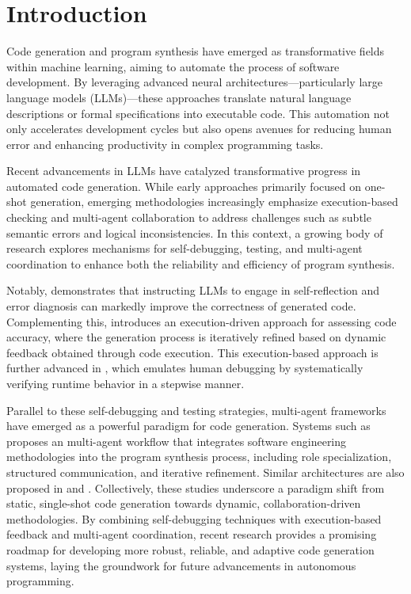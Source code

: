 

\section{Introduction}

Code generation and program synthesis have emerged as transformative fields within machine learning, aiming to automate the process of software development. By leveraging advanced neural architectures—particularly large language models (LLMs)—these approaches translate natural language descriptions or formal specifications into executable code. This automation not only accelerates development cycles but also opens avenues for reducing human error and enhancing productivity in complex programming tasks.

Recent advancements in LLMs have catalyzed transformative progress in automated code generation. While early approaches primarily focused on one-shot generation, emerging methodologies increasingly emphasize execution-based checking and multi-agent collaboration to address challenges such as subtle semantic errors and logical inconsistencies. In this context, a growing body of research explores mechanisms for self-debugging, testing, and multi-agent coordination to enhance both the reliability and efficiency of program synthesis.

Notably, \cite{TeachSelfDebug} demonstrates that instructing LLMs to engage in self-reflection and error diagnosis can markedly improve the correctness of generated code. Complementing this, \cite{LEVER} introduces an execution-driven approach for assessing code accuracy, where the generation process is iteratively refined based on dynamic feedback obtained through code execution. This execution-based approach is further advanced in \cite{LDB}, which emulates human debugging by systematically verifying runtime behavior in a stepwise manner. 

Parallel to these self-debugging and testing strategies, multi-agent frameworks have emerged as a powerful paradigm for code generation. Systems such as \cite{MetaGPT, MapCoder, QualityFlow} proposes an multi-agent workflow that integrates software engineering methodologies into the program synthesis process, including role specialization, structured communication, and iterative refinement. Similar architectures are also proposed in \cite{AgentCoder} and \cite{CODESIM}. Collectively, these studies underscore a paradigm shift from static, single-shot code generation towards dynamic, collaboration-driven methodologies. By combining self-debugging techniques with execution-based feedback and multi-agent coordination, recent research provides a promising roadmap for developing more robust, reliable, and adaptive code generation systems, laying the groundwork for future advancements in autonomous programming.

